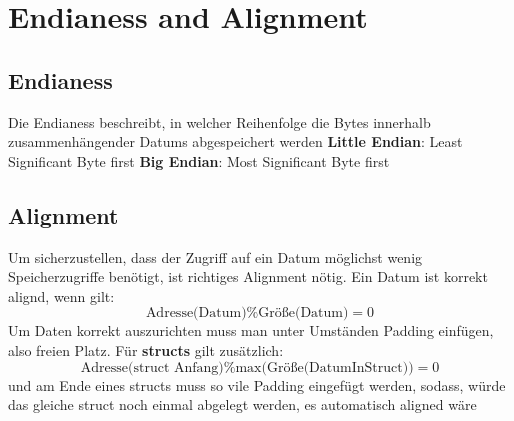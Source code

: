 \section{Endianess and Alignment}
	\subsection{Endianess}
		Die Endianess beschreibt, in welcher Reihenfolge die Bytes innerhalb zusammenhängender Datums abgespeichert werden\newline
		\textbf{Little Endian}: Least Significant Byte first \newline
		\textbf{Big Endian}: Most Significant Byte first 
	\subsection{Alignment}
		Um sicherzustellen, dass der Zugriff auf ein Datum möglichst wenig Speicherzugriffe benötigt, ist richtiges Alignment nötig. Ein Datum ist korrekt alignd, wenn gilt: 
		$$
			\text{Adresse(Datum)}\%\text{Größe(Datum)}=0
		$$
		Um Daten korrekt auszurichten muss man unter Umständen Padding einfügen, also freien Platz. \newline \newline
		Für \textbf{structs} gilt zusätzlich:
		$$
			\text{Adresse(struct Anfang)}\%\text{max(Größe(DatumInStruct))}=0
		$$
		und am Ende eines structs muss so vile Padding eingefügt werden, sodass, würde das gleiche struct noch einmal abgelegt werden, es automatisch aligned wäre